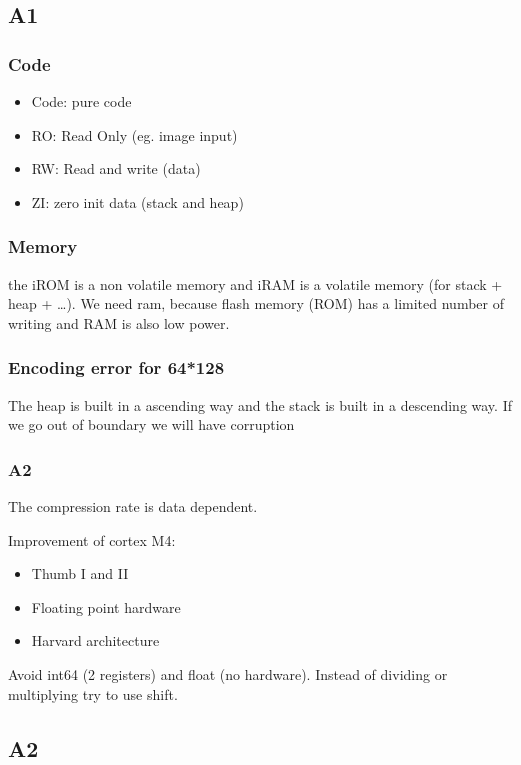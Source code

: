 
\subsection{A1}

\subsubsection{Code}

\begin{itemize}
  \item Code: pure code
  \item RO: Read Only (eg. image input)
  \item RW: Read and write (data)
  \item ZI: zero init data (stack and heap)
\end{itemize}

\subsubsection{Memory}
the iROM is a non volatile memory and iRAM is a volatile memory (for stack + heap + \dots). We need ram, because flash memory (ROM) has a limited number of writing and RAM is also low power.

\subsubsection{Encoding error for 64*128}
The heap is built in a ascending way and the stack is built in a descending way. If we go out of boundary we will have corruption



\subsubsection{A2}

The compression rate is data dependent. 

Improvement of cortex M4:
\begin{itemize}
  \item Thumb I and II
  \item Floating point hardware
  \item Harvard architecture
\end{itemize}

Avoid int64 (2 registers) and float (no hardware). Instead of dividing or multiplying try to use shift.


\subsection{A2}

